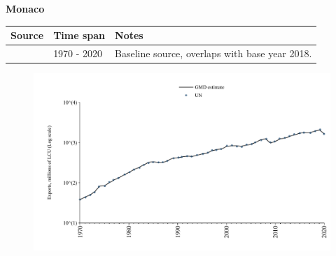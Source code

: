 \documentclass[12pt,a4paper,landscape]{article}
\begin{document}
\begin{adjustbox}{max totalsize={\paperwidth}{\paperheight},center}
\begin{minipage}[t][\textheight][t]{\textwidth}
\vspace*{0.5cm}
{}
\begin{center}
{\Large\bfseries Monaco}
\end{center}
\vspace{0.5cm}
\begin{table}[H]
\centering
\small
\begin{tabular}{|l|l|l|}
\hline
\textbf{Source} & \textbf{Time span} & \textbf{Notes} \\
\hline
\rowcolor{white}\cite{UN}& 1970 - 2020 &Baseline source, overlaps with base year 2018.\\
\hline
\end{tabular}
\end{table}
\begin{figure}[H]
\centering
\includegraphics[width=\textwidth,height=0.6\textheight,keepaspectratio]{graphs/MCO_exports.pdf}
\end{figure}
\end{minipage}
\end{adjustbox}
\end{document}
